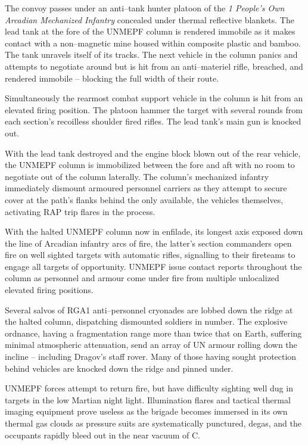 The convoy passes under an anti--tank hunter platoon of the {\it 1 People's Own Arcadian Mechanized Infantry} concealed under thermal reflective blankets. The lead tank at the fore of the UNMEPF column is rendered immobile as it makes contact with a non--magnetic mine housed within composite plastic and bamboo. The tank unravels itself of its tracks. The next vehicle in the column panics and attempts to negotiate around but is hit from an anti--materiel rifle, breached, and rendered immobile -- blocking the full width of their route.

Simultaneously the rearmost combat support vehicle in the column is hit from an elevated firing position. The platoon hammer the target with several rounds from each section's recoilless shoulder fired rifles. The lead tank's main gun is knocked out. 

With the lead tank destroyed and the engine block blown out of the rear vehicle, the UNMEPF column is immobilized between the fore and aft with no room to negotiate out of the column laterally. The column's mechanized infantry immediately dismount armoured personnel carriers as they attempt to secure cover at the path's flanks behind the only available, the vehicles themselves, activating RAP trip flares in the process.

With the halted UNMEPF column now in enfilade, its longest axis exposed down the line of Arcadian infantry arcs of fire, the latter's section commanders open fire on well sighted targets with automatic rifles, signalling to their fireteams to engage all targets of opportunity. UNMEPF issue contact reports throughout the column as personnel and armour come under fire from multiple unlocalized elevated firing positions.

Several salvos of RGA1 anti--personnel cryonades are lobbed down the ridge at the halted column, dispatching dismounted soldiers in number. The explosive ordnance, having a fragmentation range more than twice that on Earth, suffering minimal atmospheric attenuation, send an array of UN armour rolling down the incline -- including Dragov's staff rover. Many of those having sought protection behind vehicles are knocked down the ridge and pinned under.

UNMEPF forces attempt to return fire, but have difficulty sighting well dug in targets in the low Martian night light. Illumination flares and tactical thermal imaging equipment prove useless as the brigade becomes immersed in its own thermal gas clouds as pressure suits are systematically punctured, degas, and the occupants rapidly bleed out in the near vacuum of C.

